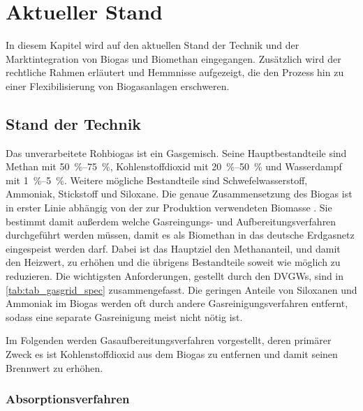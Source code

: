 \section{Aktueller Stand}

In diesem Kapitel wird auf den aktuellen Stand der Technik und der Marktintegration von Biogas und Biomethan eingegangen. Zusätzlich wird der rechtliche Rahmen erläutert und Hemmnisse aufgezeigt, die den Prozess hin zu einer Flexibilisierung von Biogasanlagen erschweren.


\subsection{Stand der Technik}\label{chap:stateofart}
Das unverarbeitete Rohbiogas ist ein Gasgemisch. Seine Hauptbestandteile sind Methan mit \SIrange{50}{75}{\percent}, Kohlenstoffdioxid mit \SIrange{20}{50}{\percent} und Wasserdampf mit \SIrange{1}{5}{\percent}. Weitere mögliche Bestandteile sind Schwefelwasserstoff, Ammoniak, Stickstoff und Siloxane. Die genaue Zusammensetzung des Biogas ist in erster Linie abhängig von der zur Produktion verwendeten Biomasse \parencite{Rasi09}. Sie bestimmt damit außerdem welche Gasreingungs- und Aufbereitungsverfahren durchgeführt werden müssen, damit es als Biomethan in das deutsche Erdgasnetz eingespeist werden darf. Dabei ist das Hauptziel den Methananteil, und damit den Heizwert, zu erhöhen und die übrigens Bestandteile soweit wie möglich zu reduzieren. Die wichtigsten Anforderungen, gestellt durch den \glspl{DVGW}, sind in \ref{tab:tab_gasgrid_spec} zusammengefasst. Die geringen Anteile von Siloxanen und Ammoniak im Biogas werden oft durch andere Gasreinigungsverfahren entfernt, sodass eine separate Gasreinigung meist nicht nötig ist. \parencite{FNR14}\parencite{KoBi16}




Im Folgenden werden Gasaufbereitungsverfahren vorgestellt, deren primärer Zweck es ist Kohlenstoffdioxid aus dem Biogas zu entfernen und damit seinen Brennwert zu erhöhen.
\smallskip


\subsubsection{Absorptionsverfahren}\label{chap:absorp}

